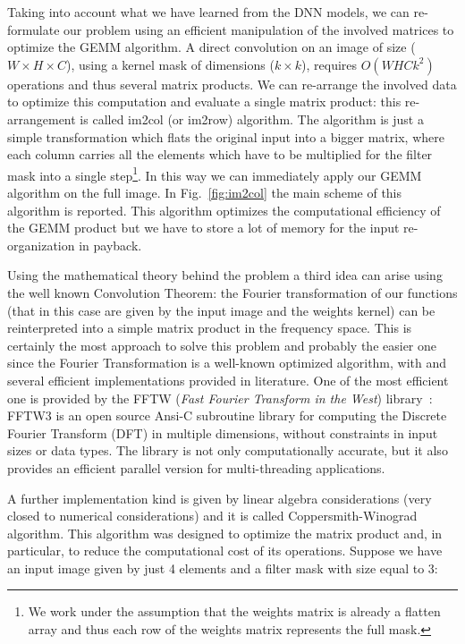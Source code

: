 \documentclass{standalone}
\begin{document}
Taking into account what we have learned from the DNN models, we can re-formulate our problem using an efficient manipulation of the involved matrices to optimize the \textsf{GEMM} algorithm.
A direct convolution on an image of size ($W\times H\times C$), using a kernel mask of dimensions ($k \times k$), requires $O(WHCk^2)$ operations and thus several matrix products.
We can re-arrange the involved data to optimize this computation and evaluate a single matrix product: this re-arrangement is called \textsf{im2col} (or \textsf{im2row}) algorithm.
The algorithm is just a simple transformation which flats the original input into a bigger matrix, where each column carries all the elements which have to be multiplied for the filter mask into a single step\footnote{
  We work under the assumption that the weights matrix is already a flatten array and thus each row of the weights matrix represents the full mask.
}.
In this way we can immediately apply our \textsf{GEMM} algorithm on the full image.
In Fig.~\ref{fig:im2col} the main scheme of this algorithm is reported.
This algorithm optimizes the computational efficiency of the \textsf{GEMM} product but we have to store a lot of memory for the input re-organization in payback.

Using the mathematical theory behind the problem a third idea can arise using the well known Convolution Theorem: the Fourier transformation of our functions (that in this case are given by the input image and the weights kernel) can be reinterpreted into a simple matrix product in the frequency space.
This is certainly the most  approach to solve this problem and probably the easier one since the Fourier Transformation is a well-known optimized algorithm, with and several efficient implementations provided in literature.
One of the most efficient one is provided by the \textsf{FFTW} (\emph{Fast Fourier Transform in the West}) library~\cite{FFTW05}: \textsf{FFTW3} is an open source \textsf{Ansi-C} subroutine library for computing the Discrete Fourier Transform (DFT) in multiple dimensions, without constraints in input sizes or data types.
The library is not only computationally accurate, but it also provides an efficient parallel version for multi-threading applications.

A further implementation kind is given by linear algebra considerations (very closed to numerical considerations) and it is called \textsf{Coppersmith-Winograd algorithm}.
This algorithm was designed to optimize the matrix product and, in particular, to reduce the computational cost of its operations.
Suppose we have an input image given by just 4 elements and a filter mask with size equal to 3:
\end{document}
